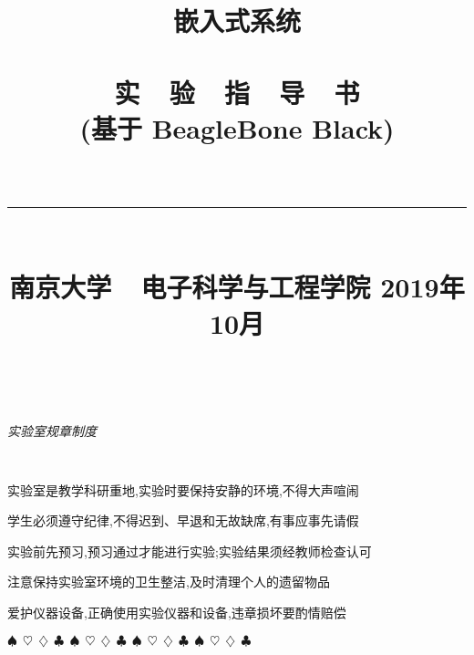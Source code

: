 \documentclass[a4paper,11pt]{book}
\title{
\begin{flushright}
\bf 嵌入式系统 \\ \ \\
 \textsf{实\ \ 验\ \ 指\ \ 导\ \ 书\\
(基于 BeagleBone Black)} \\ \ \\
\rule[10pt]{.6\textwidth}{2pt}\\
\large \textsf{南京大学~~电子科学与工程学院}
\vskip 4cm 2019年10月
\end{flushright}
}
\author{}
\date{}
\renewenvironment{enumerate}
{\oldenum\setlength{\parskip}{\smallskipamount} \itemsep=-2pt}
{\oldendenum}
\begin{document}
\frontmatter
\maketitle

\thispagestyle{empty} ~ \vskip 2cm
\begin{center} \LARGE \it \textsf{实验室规章制度} \end{center}
\large \tt
\begin{enumerate}\itemsep=-5pt
  \item 实验室是教学科研重地,实验时要保持安静的环境,不得大声喧闹
  \item 学生必须遵守纪律,不得迟到、早退和无故缺席,有事应事先请假
  \item 实验前先预习,预习通过才能进行实验;实验结果须经教师检查认可
  \item 注意保持实验室环境的卫生整洁,及时清理个人的遗留物品
  \item 爱护仪器设备,正确使用实验仪器和设备,违章损坏要酌情赔偿
\end{enumerate}

\vspace{4mm}\begin{center}
$\spadesuit~~ \heartsuit~~ \diamondsuit~~ \clubsuit~~
\spadesuit~~ \heartsuit~~ \diamondsuit~~ \clubsuit~~
\spadesuit~~ \heartsuit~~ \diamondsuit~~ \clubsuit~~
\spadesuit~~ \heartsuit~~ \diamondsuit~~ \clubsuit~~$
\end{center}\vspace{4mm}


\frontmatter
\setlength{\parindent}{2em}
\setlength\doublerulesep{.2pt}

\baselineskip=17pt
\tableofcontents

\let\oldchapter\chapter
\renewcommand{\chapter}[2]
{\oldchapter{#1}
   \addthumb{#1}{\bf #2}{white}{gray}
}

\mainmatter
\pagestyle{headings}
\setcounter{page}{1}













\end{document}

